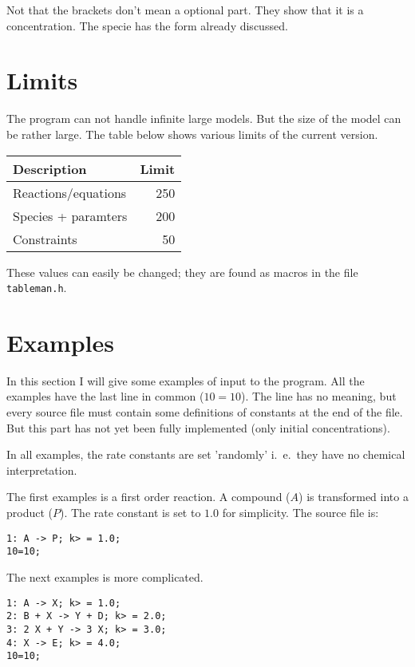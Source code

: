 Not that the brackets don't mean a optional part. They show that it is a concentration. The
specie has the form already discussed. 

\section{Limits}
The program can not handle infinite large models. But the size of the 
model can be rather large. The table below shows various limits of the
current version.

\vspace{.2cm}
\begin{tabular}{|l|r|}
\hline 
 Description           &  Limit  \\ \hline \hline 
 Reactions/equations   &    250  \\ \hline
 Species + paramters   &   200   \\ \hline
 Constraints           &    50   \\ 
\hline 
\end{tabular}
\vspace{.2cm}

These values can easily be changed; they are found as macros in the
file {\tt tableman.h}.

\section{Examples}
In this section I will give some examples of input to the program.  
All the examples have the last line in common ($10 = 10$). The line has
no meaning, but every source file must contain some definitions of constants 
at the end of the file. But this part has not yet been fully implemented (only
initial concentrations).

In all examples, the rate constants are set 'randomly' i.~e.~they
have no chemical interpretation.

The first examples is a first order reaction. A compound ($A$) is transformed
into a product ($P$). The rate constant is set to $1.0$ for simplicity. The source
file is:
\begin{verbatim}
1: A -> P; k> = 1.0;
10=10;
\end{verbatim}

The next examples is more complicated. 
\begin{verbatim}
1: A -> X; k> = 1.0;
2: B + X -> Y + D; k> = 2.0;
3: 2 X + Y -> 3 X; k> = 3.0;
4: X -> E; k> = 4.0;
10=10;
\end{verbatim}

